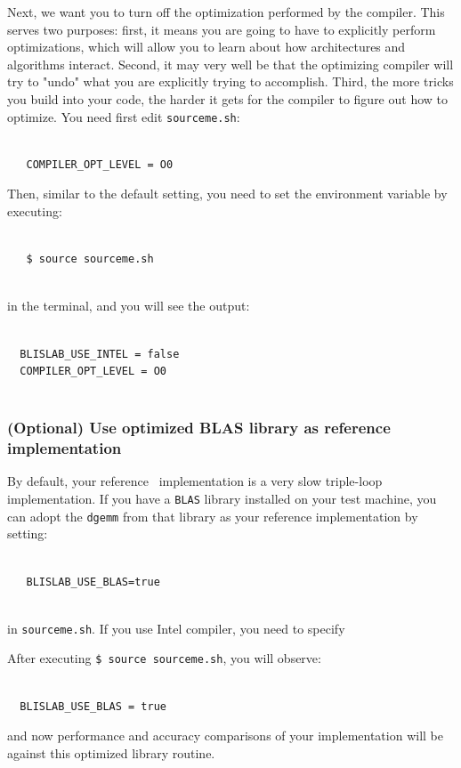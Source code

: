 Next, we want you to turn off the optimization performed by the compiler.  This serves two purposes: first, it means you are going to have to explicitly perform optimizations, which will allow you to learn about how architectures and algorithms interact.  Second, it may very well be that the optimizing compiler will try to "undo" what you are explicitly trying to accomplish.  Third, the more tricks you build into your code, the harder it gets for the compiler to figure out how to optimize.
You need first edit {\tt sourceme.sh}: 
\begin{verbatim}

   COMPILER_OPT_LEVEL = O0

\end{verbatim}
Then, similar to the default setting, you need to set the environment variable by executing:
\begin{verbatim}

   $ source sourceme.sh
   
\end{verbatim}
in the terminal, and you will see the output:
\begin{verbatim}

  BLISLAB_USE_INTEL = false
  COMPILER_OPT_LEVEL = O0
  
\end{verbatim}

\subsubsection{(\textbf{Optional}) Use optimized BLAS library as reference implementation}

By default, your reference \Gemm\ implementation is a very slow triple-loop implementation.
If you have a {\tt BLAS} library installed on your test machine, you can adopt the {\tt dgemm} from that library as your reference implementation by setting:
\begin{verbatim}

   BLISLAB_USE_BLAS=true
   
\end{verbatim}
in {\tt sourceme.sh}.
If you use Intel compiler, you need to specify

After executing {\tt \$ source sourceme.sh}, you will observe:
\begin{verbatim}

  BLISLAB_USE_BLAS = true

\end{verbatim}
and now performance and accuracy comparisons of your implementation will be against this optimized library routine.

